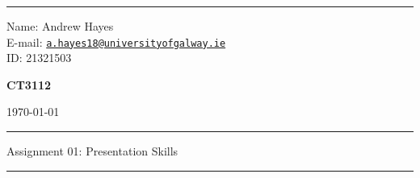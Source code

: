\documentclass[a4paper]{article}
\begin{document}
\hrule \medskip
\begin{minipage}{0.295\textwidth} 
    \raggedright
    \footnotesize 
    Name: Andrew Hayes \\
    E-mail: \href{mailto://a.hayes18@universityofgalway.ie}{\texttt{a.hayes18@universityofgalway.ie}}  \hfill\\   
    ID: 21321503 \hfill
\end{minipage}
\begin{minipage}{0.4\textwidth} 
    \centering 
    \vspace{0.4em}
    \Large 
    \textbf{CT3112} \\ 
\end{minipage}
\begin{minipage}{0.295\textwidth} 
    \raggedleft
    \today
\end{minipage}
\medskip\hrule 
\begin{center}
    \normalsize
    Assignment 01: Presentation Skills
\end{center}
\hrule
\end{document}
